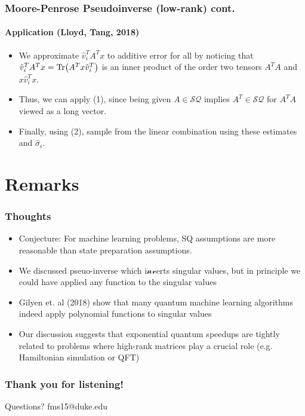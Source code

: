 \documentclass{beamer}
\newcommand\0{\mathbf{0}}
\newcommand\<{\langle}
\renewcommand\>{\rangle}
\begin{document}
\begin{frame}
\frametitle{Moore-Penrose Pseudoinverse (low-rank) cont.} 	
\framesubtitle{Application (Lloyd, Tang, 2018)}
\begin{itemize}
\item We approximate $\hat{v}_i^TA^Tx$ to additive error for all by noticing that $\hat{v}_i^TA^Tx = \Tr(A^Tx\hat{v}_i^T)$ is an inner product of the order two tensors $A^TA$ and $x\hat{v}_i^Tx$. 
\item Thus, we can apply (1), since being given $A \in \mathcal{SQ}$ implies $A^T \in \mathcal{SQ}$ for $A^TA$ viewed as a long vector. 
\item Finally, using (2), sample from the linear combination using these estimates and $\hat{\sigma}_i$.	
\end{itemize}
\end{frame}

\section{Remarks}

\begin{frame}
\frametitle{Thoughts}	

\begin{itemize}
\item Conjecture: For machine learning problems, SQ assumptions are more reasonable than state preparation assumptions.
\item We discussed pseuo-inverse which i$\mathcal{nv}$erts singular values, but in principle we could have applied any function to the singular values
\item Gilyen et. al (2018) show that many quantum machine learning algorithms indeed apply polynomial functions to singular values
\item Our discussion suggests that exponential quantum speedups are tightly related to problems where high-rank matrices play a crucial role (e.g. Hamiltonian simulation or QFT)
\end{itemize}
\end{frame}

\begin{frame}
\frametitle{Thank you for listening!}

Questions? fms15@duke.edu	
\end{frame}




\end{document}
